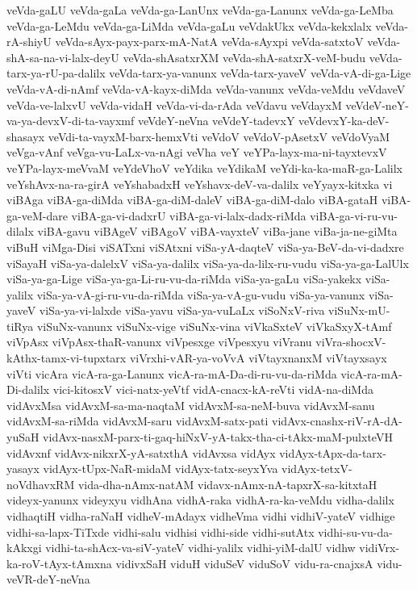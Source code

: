 {veVda-gaLU
veVda-gaLa
veVda-ga-LanUnx
veVda-ga-Lanunx
veVda-ga-LeMba
veVda-ga-LeMdu
veVda-ga-LiMda
veVda-gaLu
veVdakUkx
veVda-kekxlalx
veVda-rA-shiyU
veVda-sAyx-payx-parx-mA-NatA
veVda-sAyxpi
veVda-satxtoV
veVda-shA-sa-na-vi-lalx-deyU
veVda-shAsatxrXM
veVda-shA-satxrX-veM-budu
veVda-tarx-ya-rU-pa-dalilx
veVda-tarx-ya-vanunx
veVda-tarx-yaveV
veVda-vA-di-ga-Lige
veVda-vA-di-nAmf
veVda-vA-kayx-diMda
veVda-vanunx
veVda-veMdu
veVdaveV
veVda-ve-lalxvU
veVda-vidaH
veVda-vi-da-rAda
veVdavu
veVdayxM
veVdeV-neY-va-ya-devxV-di-ta-vayxmf
veVdeY-neVna
veVdeY-tadevxY
veVdevxY-ka-deV-shasayx
veVdi-ta-vayxM-barx-hemxVti
veVdoV
veVdoV-pAsetxV
veVdoVyaM
veVga-vAnf
veVga-vu-LaLx-va-nAgi
veVha
veY
veYPa-layx-ma-ni-tayxtevxV
veYPa-layx-meVvaM
veYdeVhoV
veYdika
veYdikaM
veYdi-ka-ka-maR-ga-Lalilx
veYshAvx-na-ra-girA
veYshabadxH
veYshavx-deV-va-dalilx
veYyayx-kitxka
vi
viBAga
viBA-ga-diMda
viBA-ga-diM-daleV
viBA-ga-diM-dalo
viBA-gataH
viBA-ga-veM-dare
viBA-ga-vi-dadxrU
viBA-ga-vi-lalx-dadx-riMda
viBA-ga-vi-ru-vu-dilalx
viBA-gavu
viBAgeV
viBAgoV
viBA-vayxteV
viBa-jane
viBa-ja-ne-giMta
viBuH
viMga-Disi
viSATxni
viSAtxni
viSa-yA-daqteV
viSa-ya-BeV-da-vi-dadxre
viSayaH
viSa-ya-dalelxV
viSa-ya-dalilx
viSa-ya-da-lilx-ru-vudu
viSa-ya-ga-LalUlx
viSa-ya-ga-Lige
viSa-ya-ga-Li-ru-vu-da-riMda
viSa-ya-gaLu
viSa-yakekx
viSa-yalilx
viSa-ya-vA-gi-ru-vu-da-riMda
viSa-ya-vA-gu-vudu
viSa-ya-vanunx
viSa-yaveV
viSa-ya-vi-lalxde
viSa-yavu
viSa-ya-vuLaLx
viSoNxV-riva
viSuNx-mU-tiRya
viSuNx-vanunx
viSuNx-vige
viSuNx-vina
viVkaSxteV
viVkaSxyX-tAmf
viVpAsx
viVpAsx-thaR-vanunx
viVpesxge
viVpesxyu
viVranu
viVra-shocxV-kAthx-tamx-vi-tupxtarx
viVrxhi-vAR-ya-voVvA
viVtayxnanxM
viVtayxsayx
viVti
vicAra
vicA-ra-ga-Lanunx
vicA-ra-mA-Da-di-ru-vu-da-riMda
vicA-ra-mA-Di-dalilx
vici-kitosxV
vici-natx-yeVtf
vidA-cnacx-kA-reVti
vidA-na-diMda
vidAvxMsa
vidAvxM-sa-ma-naqtaM
vidAvxM-sa-neM-buva
vidAvxM-sanu
vidAvxM-sa-riMda
vidAvxM-saru
vidAvxM-satx-pati
vidAvx-cnashx-riV-rA-dA-yuSaH
vidAvx-nasxM-parx-ti-gaq-hiNxV-yA-takx-tha-ci-tAkx-maM-pulxteVH
vidAvxnf
vidAvx-nikxrX-yA-satxthA
vidAvxsa
vidAyx
vidAyx-tApx-da-tarx-yasayx
vidAyx-tUpx-NaR-midaM
vidAyx-tatx-seyxYva
vidAyx-tetxV-noVdhavxRM
vida-dha-nAmx-natAM
vidavx-nAmx-nA-tapxrX-sa-kitxtaH
videyx-yanunx
videyxyu
vidhAna
vidhA-raka
vidhA-ra-ka-veMdu
vidha-dalilx
vidhaqtiH
vidha-raNaH
vidheV-mAdayx
vidheVma
vidhi
vidhiV-yateV
vidhige
vidhi-sa-lapx-TiTxde
vidhi-salu
vidhisi
vidhi-side
vidhi-sutAtx
vidhi-su-vu-da-kAkxgi
vidhi-ta-shAcx-va-siV-yateV
vidhi-yalilx
vidhi-yiM-dalU
vidhw
vidiVrx-ka-roV-tAyx-tAmxna
vidivxSaH
viduH
viduSeV
viduSoV
vidu-ra-cnajxsA
vidu-veVR-deY-neVna
}

